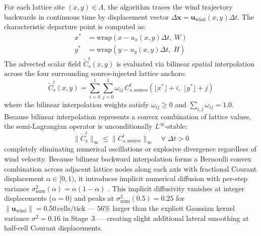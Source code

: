 For each lattice site $(x, y) \in \Lambda$, the algorithm traces the wind trajectory backwards in continuous time by displacement vector $\Delta \mathbf{x} = \mathbf{u}_{\text{wind}}(x, y) \Delta t$. The characteristic departure point is computed as:
\begin{align}
  x^* &= \text{wrap}\left( x - u_x(x, y) \Delta t, \; W \right) \label{eq:departure_point_x} \\
  y^* &= \text{wrap}\left( y - u_y(x, y) \Delta t, \; H \right) \label{eq:departure_point_y}
\end{align}
The advected scalar field $\tilde{C}_s^t(x, y)$ is evaluated via bilinear spatial interpolation across the four surrounding source-injected lattice anchors:
\begin{equation}
  \tilde{C}_s^t(x, y) = \sum_{i=0}^1 \sum_{j=0}^1 \omega_{ij} \, C_{s,\text{source}}^t\left( \lfloor x^* \rfloor + i, \; \lfloor y^* \rfloor + j \right)
  \label{eq:bilinear_interpolation}
\end{equation}
where the bilinear interpolation weights satisfy $\omega_{ij} \ge 0$ and $\sum_{i,j} \omega_{ij} = 1.0$. Because bilinear interpolation represents a convex combination of lattice values, the semi-Lagrangian operator is unconditionally $L^\infty$-stable:
\begin{equation}
  \|\tilde{C}_s^t\|_{\infty} \le \|C_{s,\text{source}}^t\|_{\infty} \quad \forall \; \Delta t > 0
  \label{eq:linfty_stability}
\end{equation}
completely eliminating numerical oscillations or explosive divergence regardless of wind velocity. Because bilinear backward interpolation forms a Bernoulli convex combination across adjacent lattice nodes along each axis with fractional Courant displacement $\alpha \in [0, 1)$, it introduces implicit numerical diffusion with per-step variance $\sigma_{\text{num}}^2(\alpha) = \alpha(1 - \alpha)$ \cite{staniforth1991semi}. This implicit diffusivity vanishes at integer displacements ($\alpha = 0$) and peaks at $\sigma_{\text{num}}^2(0.5) = 0.25$ for $\|\mathbf{u}_{\text{wind}}\| = 0.50\,\text{cells/tick}$ --- $56\%$ larger than the explicit Gaussian kernel variance $\sigma^2 = 0.16$ in Stage~3 --- creating slight additional lateral smoothing at half-cell Courant displacements.

